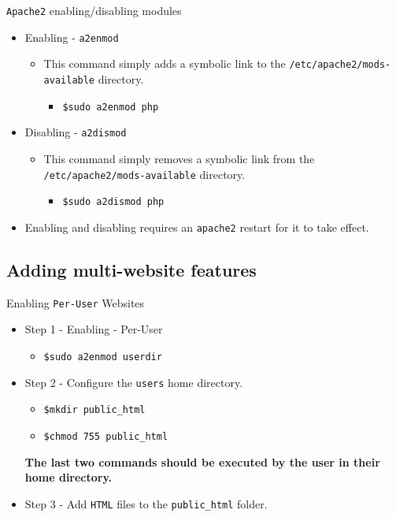 \documentclass[xcolor=table]{beamer}
\begin{document}
\begin{frame}{\texttt{Apache2} enabling/disabling modules}
  \begin{itemize}
    \item Enabling - \texttt{a2enmod}
      \begin{itemize}
        \item This command simply adds a symbolic link to the \texttt{/etc/apache2/mods-available} directory.
          \begin{itemize}
            \item \texttt{\$sudo a2enmod php}
          \end{itemize}
        \end{itemize}
    \item Disabling - \texttt{a2dismod}
        \begin{itemize}
          \item This command simply removes a symbolic link from the \texttt{/etc/apache2/mods-available} directory.
            \begin{itemize}
              \item \texttt{\$sudo a2dismod php}
            \end{itemize}
          \end{itemize}
    \item Enabling and disabling requires an \texttt{apache2} restart for it to take effect.
  \end{itemize}
\end{frame}

\subsection{Adding multi-website features}
\begin{frame}{Enabling \texttt{Per-User} Websites}
   \begin{itemize}
      \item Step 1 - Enabling - Per-User
        \begin{itemize}
          \item \texttt{\$sudo a2enmod userdir}
        \end{itemize}
      \item  Step 2 - Configure the \texttt{users} home directory.
        \begin{itemize}
          \item \texttt{\$mkdir public\_html} 
          \item \texttt{\$chmod 755 public\_html}
        \end{itemize}
        \begin{tcolorbox}
          \begin{center}
            \scriptsize \textbf{The last two commands should be executed by the user in their home directory.}
          \end{center}
        \end{tcolorbox}
      \item  Step 3 - Add \texttt{HTML} files to the \texttt{public\_html} folder.
    \end{itemize}
\end{frame}
\end{document}
